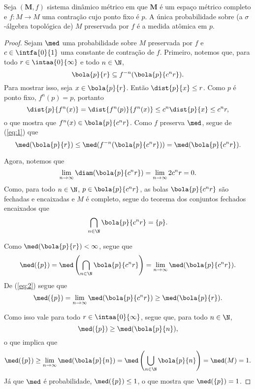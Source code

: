 \begin{proposition}
Seja $(\bm M,f)$ sistema dinâmico métrico em que $\bm M$ é um espaço métrico completo e $f\colon M \to M$ uma contração cujo ponto fixo é $p$. A única probabilidade sobre (a $\sigma$-álgebra topológica de) $M$ preservada por $f$ é a medida atômica em $p$.
\end{proposition}
\begin{proof}
Sejam $\med$ uma probabilidade sobre $M$ preservada por $f$ e $c \in \intfa{0}{1}$ uma constante de contração de $f$. Primeiro, notemos que, para todo $r \in \intaa{0}{\infty}$ e todo $n \in \N$,
	\begin{equation}\label{eq:1}
	\bola{p}{r} \subseteq f^{-n}(\bola{p}{c^n r}).
	\end{equation}
Para mostrar isso, seja $x \in \bola{p}{r}$. Então $\dist{p}{x} \leq r$. Como $p$ é ponto fixo, $f^n(p)=p$, portanto
	\begin{equation*}
	\dist{p}{f^n(x)} = \dist{f^n(p)}{f^n(x)} \leq c^n \dist{p}{x} \leq c^n r,
	\end{equation*}
o que mostra que $f^n(x) \in \bola{p}{c^n r}$. Como $f$ preserva $\med$, segue de (\ref{eq:1}) que
	\begin{equation}\label{eq:2}
	\med(\bola{p}{r}) \leq \med(f^{-n}(\bola{p}{c^n r})) = \med(\bola{p}{c^n r}).
	\end{equation}

Agora, notemos que
	\begin{equation*}
	\lim_{n \to \infty} \diam(\bola{p}{c^n r}) = \lim_{n \to \infty} 2c^n r = 0.
	\end{equation*}
Como, para todo $n \in \N$, $p \in \bola{p}{c^n r}$, as bolas $\bola{p}{c^n r}$ são fechadas e encaixadas e $M$ é completo, segue do teorema dos conjuntos fechados encaixados que
	\begin{equation*}
	\bigcap_{n \in \N} \bola{p}{c^n r} = \{p\}.
	\end{equation*}

Como $\med(\bola{p}{r})<\infty$, segue que
	\begin{equation*}
	\med(\{p\}) = \med\left(\bigcap_{n \in \N} \bola{p}{c^n r}\right) = \lim_{n \to \infty} \med(\bola{p}{c^n r}).
	\end{equation*}
De (\ref{eq:2}) segue que
	\begin{equation*}
	\med(\{p\}) = \lim_{n \to \infty} \med(\bola{p}{c^n r}) \geq \med(\bola{p}{r}).
	\end{equation*}

Como isso vale para todo $r \in \intaa{0}{\infty}$, segue que, para todo $n \in \N$,
	\begin{equation*}
	\med(\{p\}) \geq \med(\bola{p}{n}),
	\end{equation*}
o que implica que
	\begin{equation*}
	\med(\{p\}) \geq \lim_{n \to \infty} \med(\bola{p}{n}) = \med\left( \bigcup_{n \in \N} \bola{p}{n} \right) = \med(M) = 1.
	\end{equation*}
Já que $\med$ é probabilidade, $\med(\{p\}) \leq 1$, o que mostra que $\med(\{p\}) = 1$.
\end{proof}

